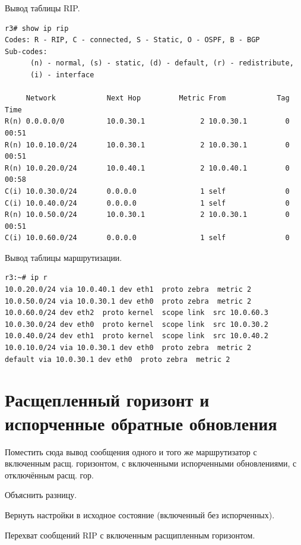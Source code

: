 \documentclass[a4paper,12pt]{article}
\begin{document}
Вывод таблицы RIP.

\begin{Verbatim}
r3# show ip rip
Codes: R - RIP, C - connected, S - Static, O - OSPF, B - BGP
Sub-codes:
      (n) - normal, (s) - static, (d) - default, (r) - redistribute,
      (i) - interface

     Network            Next Hop         Metric From            Tag Time
R(n) 0.0.0.0/0          10.0.30.1             2 10.0.30.1         0 00:51
R(n) 10.0.10.0/24       10.0.30.1             2 10.0.30.1         0 00:51
R(n) 10.0.20.0/24       10.0.40.1             2 10.0.40.1         0 00:58
C(i) 10.0.30.0/24       0.0.0.0               1 self              0
C(i) 10.0.40.0/24       0.0.0.0               1 self              0
R(n) 10.0.50.0/24       10.0.30.1             2 10.0.30.1         0 00:51
C(i) 10.0.60.0/24       0.0.0.0               1 self              0
\end{Verbatim}

Вывод таблицы маршрутизации.

\begin{Verbatim}
r3:~# ip r
10.0.20.0/24 via 10.0.40.1 dev eth1  proto zebra  metric 2 
10.0.50.0/24 via 10.0.30.1 dev eth0  proto zebra  metric 2 
10.0.60.0/24 dev eth2  proto kernel  scope link  src 10.0.60.3 
10.0.30.0/24 dev eth0  proto kernel  scope link  src 10.0.30.2 
10.0.40.0/24 dev eth1  proto kernel  scope link  src 10.0.40.2 
10.0.10.0/24 via 10.0.30.1 dev eth0  proto zebra  metric 2 
default via 10.0.30.1 dev eth0  proto zebra  metric 2 
\end{Verbatim}

\section{Расщепленный горизонт и испорченные обратные обновления}

Поместить сюда вывод сообщения одного и того же маршрутизатор с включенным расщ. горизонтом, с включенными испорченными обновлениями, с отключённым расщ. гор.

Объяснить разницу.

Вернуть настройки в исходное состояние (включенный без испорченных).

Перехват сообщений RIP с включенным расщипленным горизонтом.
\end{document}
